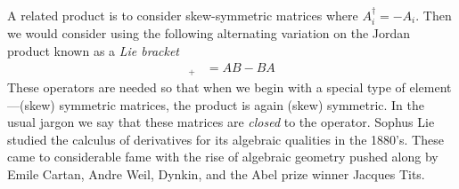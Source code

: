 A related product is to consider 
skew-symmetric matrices where $A_i^{\dagger}=-A_i$.  Then we would consider using the following 
alternating variation on the Jordan product known as a \emph{Lie bracket}
\begin{align*}
    [A,B]_+ & = AB-BA
\end{align*}
These operators are needed so that when we begin with a special type of
element---(skew) symmetric matrices, the product is again (skew) symmetric.
In the usual jargon we say that these matrices are \emph{closed} to the operator.
Sophus Lie studied the calculus of derivatives for its algebraic 
qualities in the 1880's.  These came to considerable fame with the rise of algebraic 
geometry pushed along by Emile Cartan, Andre Weil, Dynkin, and the Abel prize winner Jacques Tits. 

